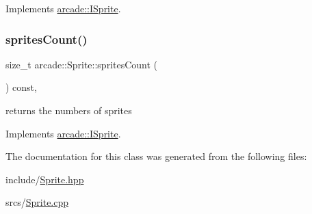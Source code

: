 Implements \hyperlink{classarcade_1_1_i_sprite_ad47b6c128695746cd59e4b87435a7f09}{arcade\+::\+I\+Sprite}.

\mbox{\label{classarcade_1_1_sprite_a99cc47358f32492ea89659b6b92f4d4c}} 
\subsubsection{\texorpdfstring{sprites\+Count()}{spritesCount()}}
{\footnotesize\ttfamily size\+\_\+t arcade\+::\+Sprite\+::sprites\+Count (\begin{DoxyParamCaption}{ }\end{DoxyParamCaption}) const\hspace{0.3cm}{\ttfamily [override]}, {\ttfamily [virtual]}}



returns the numbers of sprites 



Implements \hyperlink{classarcade_1_1_i_sprite_aa417a93a06968e42db16f8cbd2680c89}{arcade\+::\+I\+Sprite}.



The documentation for this class was generated from the following files\+:\begin{DoxyCompactItemize}
\item 
include/\hyperlink{_sprite_8hpp}{Sprite.\+hpp}\item 
srcs/\hyperlink{_sprite_8cpp}{Sprite.\+cpp}\end{DoxyCompactItemize}
